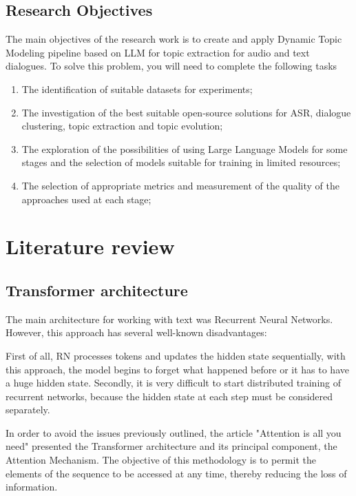 \documentclass[PMI,VKR]{HSEUniversity}
\begin{document}
\section{Research Objectives}

The main objectives of the research work is to create and apply Dynamic Topic Modeling pipeline based on LLM for topic extraction for audio and text dialogues. 
To solve this problem, you will need to complete the following tasks 
\begin{enumerate}
    \item The identification of suitable datasets for experiments;
    \item The investigation of the best suitable open-source solutions for ASR, dialogue clustering, topic extraction and topic evolution;
    \item The exploration of the possibilities of using Large Language Models for some stages and the selection of models suitable for training in limited resources;
    \item The selection of appropriate metrics and measurement of the quality of the approaches used at each stage;
\end{enumerate}

    
\chapter{Literature review}

\section{Transformer architecture}

The main architecture for working with text was Recurrent Neural Networks. However, this approach has several well-known disadvantages:

First of all, RN processes tokens and updates the hidden state sequentially, with this approach, the model begins to forget what happened before or it has to have a huge hidden state.
Secondly, it is very difficult to start distributed training of recurrent networks, because the hidden state at each step must be considered separately.

In order to avoid the issues previously outlined, the article "Attention is all you need" \cite{attention:2017} presented the Transformer architecture and its principal component, 
the Attention Mechanism. The objective of this methodology is to permit the elements of the sequence to be accessed at any time, thereby reducing the loss of information.
\end{document}
